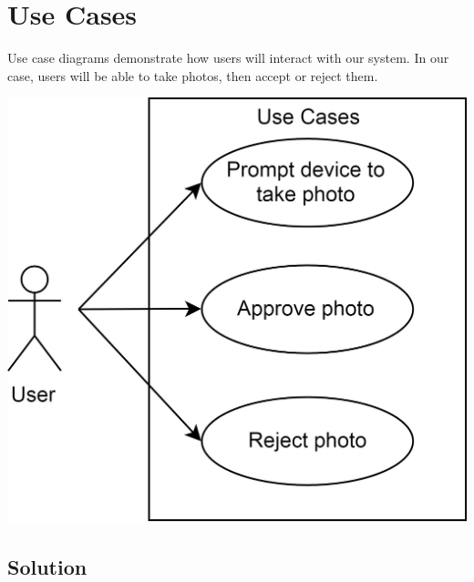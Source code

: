 \chapter{Use Cases}

Use case diagrams demonstrate how users will interact with our system. In our case, users will be able to take photos, then accept or reject them.

\includegraphics{usecasediagram.jpg}

\section{Solution}
